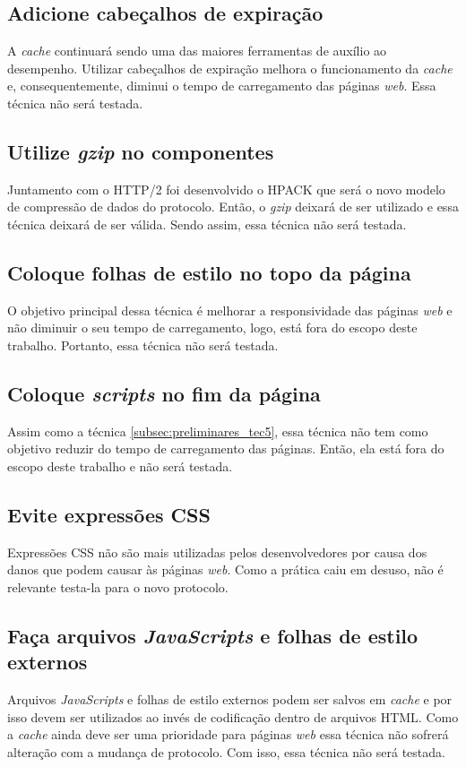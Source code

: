 \subsection{Adicione cabeçalhos de expiração}
\label{subsec:preliminares_tec3}
A \textit{cache} continuará sendo uma das maiores ferramentas de auxílio ao desempenho. Utilizar cabeçalhos de expiração melhora o funcionamento da \textit{cache} e, consequentemente, diminui o tempo de carregamento das páginas \textit{web}. Essa técnica não será testada.

\subsection{Utilize \textit{gzip} no componentes}
\label{subsec:preliminares_tec4}
Juntamento com o HTTP/2 foi desenvolvido o HPACK que será o novo modelo de compressão de dados do protocolo. Então, o \textit{gzip} deixará de ser utilizado e essa técnica deixará de ser válida. Sendo assim, essa técnica não será testada.

\subsection{Coloque folhas de estilo no topo da página}
\label{subsec:preliminares_tec5}
O objetivo principal dessa técnica é melhorar a responsividade das páginas \textit{web} e não diminuir o seu tempo de carregamento, logo, está fora do escopo deste trabalho. Portanto, essa técnica não será testada.

\subsection{Coloque \textit{scripts} no fim da página}
\label{subsec:preliminares_tec6}
Assim como a técnica \autoref{subsec:preliminares_tec5}, essa técnica não tem como objetivo reduzir do tempo de carregamento das páginas. Então, ela está fora do escopo deste trabalho e não será testada.

\subsection{Evite expressões CSS}
\label{subsec:preliminares_tec7}
Expressões CSS não são mais utilizadas pelos desenvolvedores por causa dos danos que podem causar às páginas \textit{web}. Como a prática caiu em desuso, não é relevante testa-la para o novo protocolo.

\subsection{Faça arquivos \textit{JavaScripts} e folhas de estilo externos}
\label{subsec:preliminares_tec8}
Arquivos \textit{JavaScripts} e folhas de estilo externos podem ser salvos em \textit{cache} e por isso devem ser utilizados ao invés de codificação dentro de arquivos HTML. Como a \textit{cache} ainda deve ser uma prioridade para páginas \textit{web} essa técnica não sofrerá alteração com a mudança de protocolo. Com isso, essa técnica não será testada.

